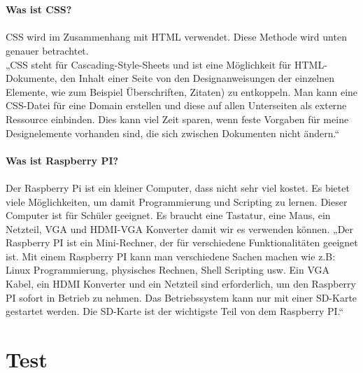 \\
\\
\textbf{Was ist CSS?} \\
\\
CSS wird im Zusammenhang mit HTML verwendet. Diese Methode wird unten genauer betrachtet. \\
„CSS steht für Cascading-Style-Sheets und ist eine Möglichkeit für HTML-Dokumente, den Inhalt einer Seite von den Designanweisungen der einzelnen Elemente, wie zum Beispiel Überschriften, Zitaten) zu entkoppeln.
Man kann eine CSS-Datei für eine Domain erstellen und diese auf allen Unterseiten als externe Ressource einbinden. Dies kann viel Zeit sparen, wenn feste Vorgaben für meine Designelemente vorhanden sind, die sich zwischen Dokumenten nicht ändern.“ 
\\
\\
\textbf{Was ist Raspberry PI?} \\
\\
Der Raspberry Pi ist ein kleiner Computer, dass nicht sehr viel kostet. Es bietet viele Möglichkeiten, um damit Programmierung und Scripting zu lernen. Dieser Computer ist für Schüler geeignet. Es braucht eine Tastatur, eine Maus, ein Netzteil, VGA und HDMI-VGA Konverter damit wir es verwenden können. 
„Der Raspberry PI ist ein Mini-Rechner, der für verschiedene Funktionalitäten geeignet ist. Mit einem Raspberry PI kann man verschiedene Sachen machen wie z.B: Linux Programmierung, physisches Rechnen, Shell Scripting usw. Ein VGA Kabel, ein HDMI Konverter und ein Netzteil sind erforderlich, um den Raspberry PI sofort in Betrieb zu nehmen. Das Betriebssystem kann nur mit einer SD-Karte gestartet werden. Die SD-Karte ist der wichtigste Teil von dem Raspberry PI.“

\section{Test}
\label{\docname}
